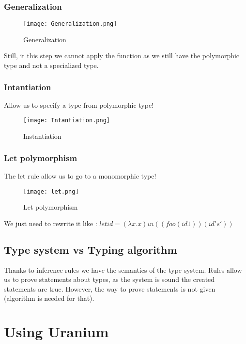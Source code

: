         \subsubsection{Generalization}
            \begin{figure}[H]
                \centering
                \texttt{[image: Generalization.png]}
                \caption{Generalization}
                \label{fig:Generalization}
            \end{figure}
            Still, it this step we cannot apply the function as we still have
            the polymorphic type and not a specialized type.
        \subsubsection{Intantiation}
            Allow us to specify a type from polymorphic type!
            \begin{figure}[H]
                \centering
                \texttt{[image: Intantiation.png]}
                \caption{Instantiation}
                \label{fig:instantiation}
            \end{figure}

        \subsubsection{Let polymorphism}
            The let rule allow us to go to a monomorphic type!
            \begin{figure}[H]
                 \centering
                 \texttt{[image: let.png]}
                 \caption{Let polymorphism}
                 \label{fig:let}
            \end{figure}
            We just need to rewrite it like : 
            $let id = (\lambda x . x) in ((foo (id 1)) (id 's'))$
    \subsection{Type system vs Typing algorithm}
        Thanks to inference rules we have the semantics of the type system.
        Rules allow us to prove statements about types, as the system is sound
        the created statements are true. However, the way to prove statements is
        not given (algorithm is needed for that). 
        
\section{Using Uranium}
\label{sec:using-uranium}

